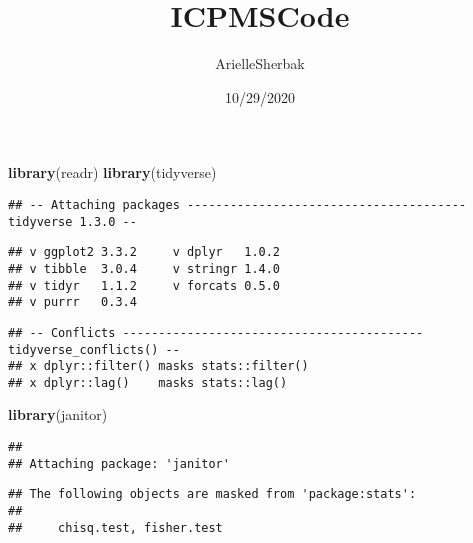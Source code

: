 \documentclass[]{article}
\title{ICPMSCode}
\author{ArielleSherbak}
\date{10/29/2020}
\newenvironment{Shaded}{\begin{snugshade}}{\end{snugshade}}
\newcommand{\KeywordTok}[1]{\textcolor[rgb]{0.13,0.29,0.53}{\textbf{#1}}}
\newcommand{\NormalTok}[1]{#1}
\begin{document}
\maketitle

\begin{Shaded}
\begin{Highlighting}[]
\KeywordTok{library}\NormalTok{(readr)}
\KeywordTok{library}\NormalTok{(tidyverse)}
\end{Highlighting}
\end{Shaded}

\begin{verbatim}
## -- Attaching packages --------------------------------------- tidyverse 1.3.0 --
\end{verbatim}

\begin{verbatim}
## v ggplot2 3.3.2     v dplyr   1.0.2
## v tibble  3.0.4     v stringr 1.4.0
## v tidyr   1.1.2     v forcats 0.5.0
## v purrr   0.3.4
\end{verbatim}

\begin{verbatim}
## -- Conflicts ------------------------------------------ tidyverse_conflicts() --
## x dplyr::filter() masks stats::filter()
## x dplyr::lag()    masks stats::lag()
\end{verbatim}

\begin{Shaded}
\begin{Highlighting}[]
\KeywordTok{library}\NormalTok{(janitor)}
\end{Highlighting}
\end{Shaded}

\begin{verbatim}
## 
## Attaching package: 'janitor'
\end{verbatim}

\begin{verbatim}
## The following objects are masked from 'package:stats':
## 
##     chisq.test, fisher.test
\end{verbatim}
\end{document}
